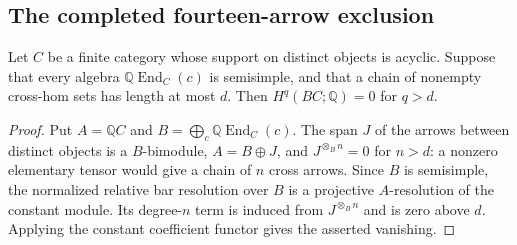 \subsection{The completed fourteen-arrow exclusion}

\begin{lemma}
\label{C:semisimple-diagonal-height}
Let $C$ be a finite category whose support on distinct objects is
acyclic.  Suppose that every algebra
$\mathbb Q\operatorname{End}_C(c)$ is semisimple, and that a chain
of nonempty cross-hom sets has length at most $d$.  Then
$H^q(BC;\mathbb Q)=0$ for $q>d$.
\end{lemma}
\begin{proof}
Put $A=\mathbb QC$ and
$B=\bigoplus_c\mathbb Q\operatorname{End}_C(c)$.
The span $J$ of the arrows between distinct objects is a
$B$-bimodule, $A=B\oplus J$, and $J^{\otimes_B n}=0$ for
$n>d$: a nonzero elementary tensor would give a chain of $n$
cross arrows.  Since $B$ is semisimple, the normalized relative
bar resolution over $B$ is a projective $A$-resolution of the
constant module.  Its degree-$n$ term is induced from
$J^{\otimes_B n}$ and is zero above $d$.  Applying the constant
coefficient functor gives the asserted vanishing.
\end{proof}


